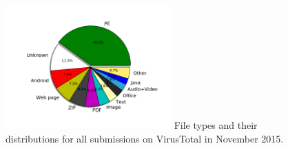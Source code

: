 \begin{figure}[t!]
\begin{center}
\includegraphics[width=2.5in]{figure/typePie}
{File types and their distributions for all submissions on VirusTotal in November 2015.}
\end{center}
\end{figure}
